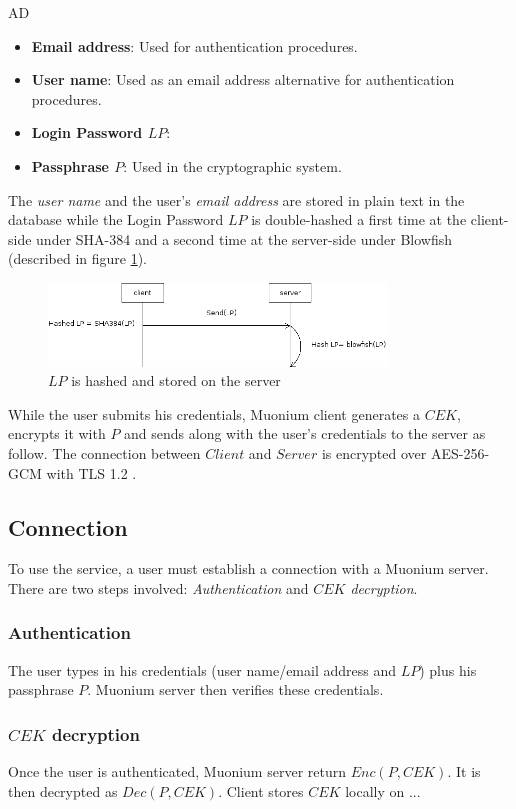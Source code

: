 AD\documentclass[a4paper,10pt]{article}
\begin{document}
\begin{itemize}
    \item \textbf{Email address}: Used for authentication procedures.
    \item \textbf{User name}: Used as an email address alternative for authentication procedures.
    \item \textbf{Login Password $LP$}:
    \item \textbf{Passphrase $P$}: Used in the cryptographic system.
\end{itemize}

The \emph{user name} and the user's \emph{email address} are stored in plain text in the database while the Login
Password $LP$ is double-hashed a first time at the client-side under SHA-384 and a second time at the server-side
under Blowfish (described in figure \ref{Fig:fig1}).

\begin{figure}[!h]
\centering
\includegraphics[width=0.8\textwidth]{diagram/figure1}
\caption{$LP$ is hashed and stored on the server}
\label{Fig:fig1}
\end{figure}

While the user submits his credentials, Muonium client generates a $CEK$, encrypts it with $P$ and sends along
with the user's credentials to the server as follow. The connection between $Client$ and $Server$ is encrypted
over AES-256-GCM with TLS 1.2 .

\subsection{Connection}
To use the service, a user must establish a connection with a Muonium server. There are two steps involved: \emph{Authentication} and \emph{$CEK$ decryption}.

\subsubsection{Authentication}
The user types in his credentials (user name/email address and $LP$) plus his passphrase $P$. Muonium server then verifies these credentials.

\subsubsection{$CEK$ decryption}
Once the user is authenticated, Muonium server return $Enc(P, CEK)$. It is then decrypted as $Dec(P, CEK)$. Client stores $CEK$ locally on ...
\end{document}
